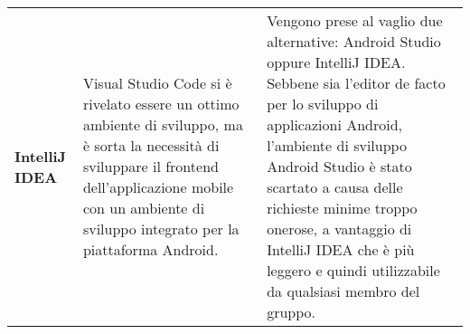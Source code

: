 \documentclass[../piano-di-qualifica.tex]{subfiles}
\begin{document}
\begin{longtable}[H]{>{\centering\bfseries}m{4cm} >{\centering\arraybackslash}m{6cm} >{\centering\arraybackslash}m{6cm}}
    IntelliJ IDEA & Visual Studio Code si è rivelato essere un ottimo ambiente di sviluppo, ma è sorta la necessità di sviluppare il frontend dell'applicazione mobile con un ambiente di sviluppo integrato per la piattaforma Android. & Vengono prese al vaglio due alternative: Android Studio oppure IntelliJ IDEA\@. Sebbene sia l'editor de facto per lo sviluppo di applicazioni Android, l'ambiente di sviluppo Android Studio è stato scartato a causa delle richieste minime troppo onerose, a vantaggio di IntelliJ IDEA che è più leggero e quindi utilizzabile da qualsiasi membro del gruppo. \\
  \end{longtable}
\end{document}
